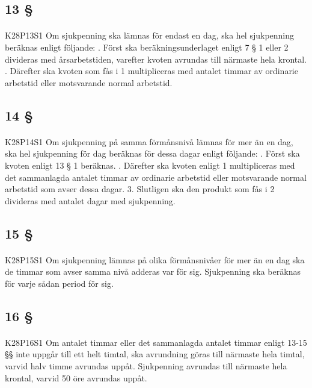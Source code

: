 \documentclass[a4paper,notitlepage,openany,10pt]{book}
\begin{document}
\subsection*{13 §}
\paragraph*{}
{\tiny K28P13S1}
Om sjukpenning ska lämnas för endast en dag, ska hel sjukpenning beräknas enligt följande:
. Först ska beräkningsunderlaget enligt 7 § 1 eller 2 divideras med årsarbetstiden, varefter kvoten avrundas till närmaste hela krontal.
. Därefter ska kvoten som fås i 1 multipliceras med antalet timmar av ordinarie arbetstid eller motsvarande normal arbetstid.
\subsection*{14 §}
\paragraph*{}
{\tiny K28P14S1}
Om sjukpenning på samma förmånsnivå lämnas för mer än en dag, ska hel sjukpenning för dag beräknas för dessa dagar enligt följande:
. Först ska kvoten enligt 13 § 1 beräknas.
. Därefter ska kvoten enligt 1 multipliceras med det sammanlagda antalet timmar av ordinarie arbetstid eller motsvarande normal arbetstid som avser dessa dagar. 3. Slutligen ska den produkt som fås i 2 divideras med antalet dagar med sjukpenning.
\subsection*{15 §}
\paragraph*{}
{\tiny K28P15S1}
Om sjukpenning lämnas på olika förmånsnivåer för mer än en dag ska de timmar som avser samma nivå adderas var för sig. Sjukpenning ska beräknas för varje sådan period för sig.
\subsection*{16 §}
\paragraph*{}
{\tiny K28P16S1}
Om antalet timmar eller det sammanlagda antalet timmar enligt 13-15 §§ inte uppgår till ett helt timtal, ska avrundning göras till närmaste hela timtal, varvid halv timme avrundas uppåt.
Sjukpenning avrundas till närmaste hela krontal, varvid 50 öre avrundas uppåt.
\end{document}
